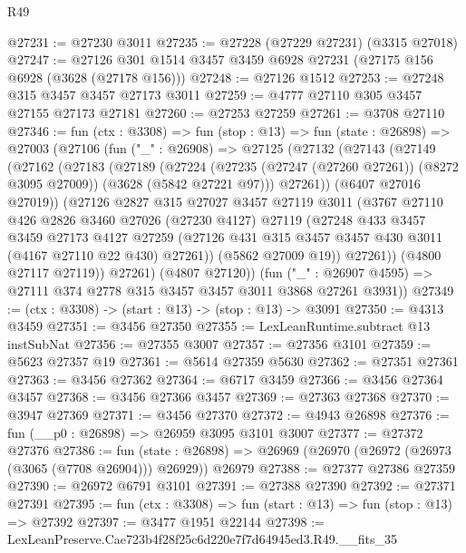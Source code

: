 \begin{lexlean}{R49}
\begin{coremodule}
@27231 := @27230 @3011
@27235 := @27228 (@27229 @27231) (@3315 @27018)
@27247 := @27126 @301 @1514 @3457 @3459 @6928 @27231 (@27175 @156 @6928 (@3628 (@27178 @156)))
@27248 := @27126 @1512
@27253 := @27248 @315 @3457 @3457 @27173 @3011
@27259 := @4777 @27110 @305 @3457 @27155 @27173 @27181
@27260 := @27253 @27259
@27261 := @3708 @27110
@27346 := fun (ctx : @3308) =>
  fun (stop : @13) =>
  fun (state : @26898) =>
  @27003
    (@27106
      (fun ("_" : @26908) =>
      @27125
        (@27132
          (@27143
            (@27149
              (@27162
                (@27183
                  (@27189
                    (@27224
                      (@27235 (@27247 (@27260 @27261)) (@8272 @3095 @27009))
                      (@3628 (@5842 @27221 @97)))
                    @27261))
                (@6407 @27016 @27019))
              (@27126
                @2827
                @315
                @27027
                @3457
                @27119
                @3011
                (@3767
                  @27110
                  @426
                  @2826
                  @3460
                  @27026
                  (@27230 @4127)
                  @27119
                  (@27248
                    @433
                    @3457
                    @3459
                    @27173
                    @4127
                    @27259
                    (@27126 @431 @315 @3457 @3457 @430 @3011 (@4167 @27110 @22 @430) @27261))
                  (@5862 @27009 @19))
                @27261))
            (@4800 @27117 @27119))
          @27261)
        (@4807 @27120))
      (fun ("_" : @26907 @4595) => @27111 @374 @2778 @315 @3457 @3457 @3011 @3868 @27261 @3931))
@27349 := (ctx : @3308) -> (start : @13) -> (stop : @13) -> @3091
@27350 := @4313 @3459
@27351 := @3456 @27350
@27355 := LexLeanRuntime.subtract @13 instSubNat
@27356 := @27355 @3007
@27357 := @27356 @3101
@27359 := @5623 @27357 @19
@27361 := @5614 @27359 @5630
@27362 := @27351 @27361
@27363 := @3456 @27362
@27364 := @6717 @3459
@27366 := @3456 @27364 @3457
@27368 := @3456 @27366 @3457
@27369 := @27363 @27368
@27370 := @3947 @27369
@27371 := @3456 @27370
@27372 := @4943 @26898
@27376 := fun (__p0 : @26898) => @26959 @3095 @3101 @3007
@27377 := @27372 @27376
@27386 := fun (state : @26898) =>
  @26969 (@26970 (@26972 (@26973 (@3065 (@7708 @26904))) @26929)) @26979
@27388 := @27377 @27386 @27359
@27390 := @26972 @6791 @3101
@27391 := @27388 @27390
@27392 := @27371 @27391
@27395 := fun (ctx : @3308) => fun (start : @13) => fun (stop : @13) => @27392
@27397 := @3477 @1951 @22144
@27398 := LexLeanPreserve.Cae723b4f28f25c6d220e7f7d64945ed3.R49.__fits_35

\end{coremodule}
\end{lexlean}
